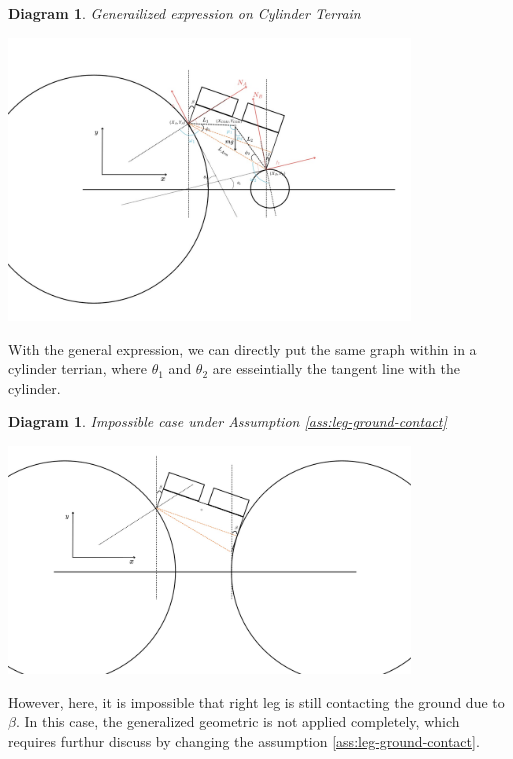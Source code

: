 \documentclass[11pt]{article}
\newtheorem{diagram}[statement]{Diagram}
\begin{document}
\begin{diagram}
    Generailized expression on Cylinder Terrain
\end{diagram}
\vspace{1ex} %
\begin{center}
    \includegraphics[width=0.8\textwidth]{figs/Generailized expression on Cylinder Terrain.jpg} %
\end{center}

With the general expression, we can directly put the same graph within in a cylinder terrian, where
\(\theta_1\) and \(\theta_2\) are esseintially the tangent line with the cylinder. 

\begin{diagram}
    Impossible case under Assumption \ref{ass:leg-ground-contact}
\end{diagram}
\vspace{1ex} %
\begin{center}
    \includegraphics[width=0.8\textwidth]{figs/Impossible case under Assumption.jpg} %
\end{center}

However, here, it is impossible that right leg is still contacting the ground due to \(\beta\). In this case, the generalized 
geometric is not applied completely, which requires furthur discuss by changing the assumption \ref{ass:leg-ground-contact}. 
\end{document}
